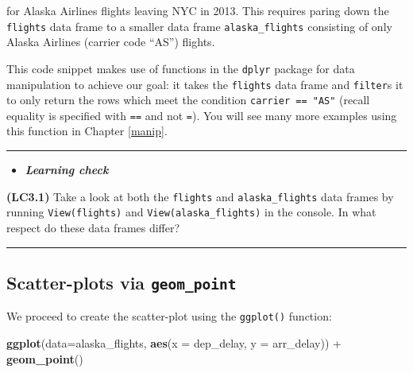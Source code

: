 \documentclass[]{tufte-book}
\newenvironment{Shaded}{\begin{snugshade}}{\end{snugshade}}
\newcommand{\KeywordTok}[1]{\textcolor[rgb]{0.13,0.29,0.53}{\textbf{{#1}}}}
\newcommand{\DataTypeTok}[1]{\textcolor[rgb]{0.13,0.29,0.53}{{#1}}}
\newcommand{\StringTok}[1]{\textcolor[rgb]{0.31,0.60,0.02}{{#1}}}
\newcommand{\NormalTok}[1]{{#1}}
\let\oldrule=\rule
\renewcommand{\rule}[1]{\oldrule{\linewidth}}
\newenvironment{rmdblock}[1]
  {\begin{shaded*}
  \begin{itemize}
  \renewcommand{\labelitemi}{
    \raisebox{-.7\height}[0pt][0pt]{
    }
  }
  \item
  }
  {
  \end{itemize}
  \end{shaded*}
  }
\newenvironment{learncheck}
  {\begin{rmdblock}{warning}}
  {\end{rmdblock}}
\begin{document}
for Alaska Airlines flights leaving NYC in 2013. This requires paring
down the \texttt{flights} data frame to a smaller data frame
\texttt{alaska\_flights} consisting of only Alaska Airlines (carrier
code ``AS'') flights.

\begin{Shaded}
\end{Shaded}

This code snippet makes use of functions in the \texttt{dplyr} package
for data manipulation to achieve our goal: it takes the \texttt{flights}
data frame and \texttt{filter}s it to only return the rows which meet
the condition \texttt{carrier\ ==\ "AS"} (recall equality is specified
with \texttt{==} and not \texttt{=}). You will see many more examples
using this function in Chapter \ref{manip}.

\begin{center}\rule{0.5\linewidth}{\linethickness}\end{center}

\begin{learncheck}
\textbf{\emph{Learning check}}
\end{learncheck}

\textbf{(LC3.1)} Take a look at both the \texttt{flights} and
\texttt{alaska\_flights} data frames by running \texttt{View(flights)}
and \texttt{View(alaska\_flights)} in the console. In what respect do
these data frames differ?

\begin{center}\rule{0.5\linewidth}{\linethickness}\end{center}

\subsection{\texorpdfstring{Scatter-plots via
\texttt{geom\_point}}{Scatter-plots via geom\_point}}\label{scatter-plots-via-geom_point}

We proceed to create the scatter-plot using the \texttt{ggplot()}
function:

\begin{Shaded}
\begin{Highlighting}[]
\KeywordTok{ggplot}\NormalTok{(}\DataTypeTok{data=}\NormalTok{alaska_flights, }\KeywordTok{aes}\NormalTok{(}\DataTypeTok{x =} \NormalTok{dep_delay, }\DataTypeTok{y =} \NormalTok{arr_delay)) +}\StringTok{ }
\StringTok{  }\KeywordTok{geom_point}\NormalTok{()}
\end{Highlighting}
\end{Shaded}
\end{document}
